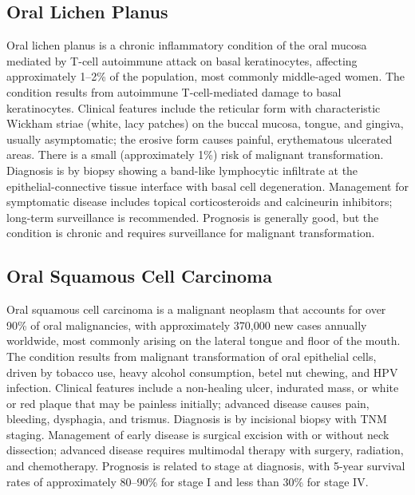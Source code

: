 \subsection{Oral Lichen Planus}
\label{sec:Oral Lichen Planus}
Oral lichen planus is a chronic inflammatory condition of the oral mucosa mediated by T-cell autoimmune attack on basal keratinocytes, affecting approximately 1--2\% of the population, most commonly middle-aged women. The condition results from autoimmune T-cell-mediated damage to basal keratinocytes. Clinical features include the reticular form with characteristic Wickham striae (white, lacy patches) on the buccal mucosa, tongue, and gingiva, usually asymptomatic; the erosive form causes painful, erythematous ulcerated areas. There is a small (approximately 1\%) risk of malignant transformation. Diagnosis is by biopsy showing a band-like lymphocytic infiltrate at the epithelial-connective tissue interface with basal cell degeneration. Management for symptomatic disease includes topical corticosteroids and calcineurin inhibitors; long-term surveillance is recommended. Prognosis is generally good, but the condition is chronic and requires surveillance for malignant transformation.

\subsection{Oral Squamous Cell Carcinoma}
\label{sec:Oral Squamous Cell Carcinoma}
Oral squamous cell carcinoma is a malignant neoplasm that accounts for over 90\% of oral malignancies, with approximately 370,000 new cases annually worldwide, most commonly arising on the lateral tongue and floor of the mouth. The condition results from malignant transformation of oral epithelial cells, driven by tobacco use, heavy alcohol consumption, betel nut chewing, and HPV infection. Clinical features include a non-healing ulcer, indurated mass, or white or red plaque that may be painless initially; advanced disease causes pain, bleeding, dysphagia, and trismus. Diagnosis is by incisional biopsy with TNM staging. Management of early disease is surgical excision with or without neck dissection; advanced disease requires multimodal therapy with surgery, radiation, and chemotherapy. Prognosis is related to stage at diagnosis, with 5-year survival rates of approximately 80--90\% for stage I and less than 30\% for stage IV.

